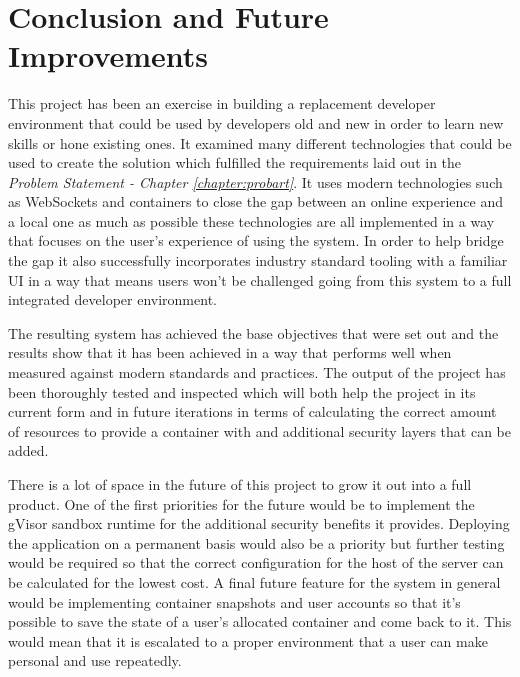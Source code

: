 \documentclass[12pt, a4paper]{extreport}
\begin{document}
\pagebreak


\chapter{Conclusion and Future Improvements} \label{conclusion}


This project has been an exercise in building a replacement developer environment that could be used by developers old and new in order to learn new skills or hone existing ones. It examined many different technologies that could be used to create the solution which fulfilled the requirements laid out in the \textit{Problem Statement - Chapter \ref{chapter:probart}}. It uses modern technologies such as WebSockets and containers to close the gap between an online experience and a local one as much as possible these technologies are all implemented in a way that focuses on the user's experience of using the system. In order to help bridge the gap it also successfully incorporates industry standard tooling with a familiar UI in a way that means users won't be challenged going from this system to a full integrated developer environment.

The resulting system has achieved the base objectives that were set out and the results show that it has been achieved in a way that performs well when measured against modern standards and practices. The output of the project has been thoroughly tested and inspected which will both help the project in its current form and in future iterations in terms of calculating the correct amount of resources to provide a container with and additional security layers that can be added.

There is a lot of space in the future of this project to grow it out into a full product. One of the first priorities for the future would be to implement the gVisor sandbox runtime for the additional security benefits it provides. Deploying the application on a permanent basis would also be a priority but further testing would be required so that the correct configuration for the host of the server can be calculated for the lowest cost. A final future feature for the system in general would be implementing container snapshots and user accounts so that it's possible to save the state of a user's allocated container and come back to it. This would mean that it is escalated to a proper environment that a user can make personal and use repeatedly. 
\end{document}
